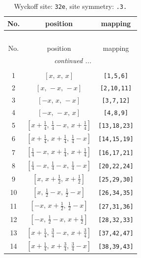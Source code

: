 \documentclass[fleqn,8pt]{jsarticle}
\begin{document}
\renewcommand{\arraystretch}{1.2}
\begin{longtable}{ccc}
\caption{Wyckoff site: {\tt 32e}, site symmetry: {\tt .3.}}
 \\
 \hline \hline
No. & position & mapping \\ \hline \endfirsthead

\multicolumn{2}{l}{\tablename\ \thetable{}} \\
 \hline \hline
No. & position & mapping \\ \hline \endhead

 \hline \hline
\multicolumn{2}{r}{\footnotesize\it continued ...} \\ \endfoot

 \hline \hline
\multicolumn{2}{r}{} \\ \endlastfoot

1 & $\left[ x,\, x,\, x \right]$ & {\tt [1,5,6]} \\ \hline
2 & $\left[ x,\, - x,\, - x \right]$ & {\tt [2,10,11]} \\ \hline
3 & $\left[ - x,\, x,\, - x \right]$ & {\tt [3,7,12]} \\ \hline
4 & $\left[ - x,\, - x,\, x \right]$ & {\tt [4,8,9]} \\ \hline
5 & $\left[ x + \frac{1}{4},\, \frac{1}{4} - x,\, x + \frac{1}{4} \right]$ & {\tt [13,18,23]} \\ \hline
6 & $\left[ x + \frac{1}{4},\, x + \frac{1}{4},\, \frac{1}{4} - x \right]$ & {\tt [14,15,19]} \\ \hline
7 & $\left[ \frac{1}{4} - x,\, x + \frac{1}{4},\, x + \frac{1}{4} \right]$ & {\tt [16,17,21]} \\ \hline
8 & $\left[ \frac{1}{4} - x,\, \frac{1}{4} - x,\, \frac{1}{4} - x \right]$ & {\tt [20,22,24]} \\ \hline
9 & $\left[ x,\, x + \frac{1}{2},\, x + \frac{1}{2} \right]$ & {\tt [25,29,30]} \\ \hline
10 & $\left[ x,\, \frac{1}{2} - x,\, \frac{1}{2} - x \right]$ & {\tt [26,34,35]} \\ \hline
11 & $\left[ - x,\, x + \frac{1}{2},\, \frac{1}{2} - x \right]$ & {\tt [27,31,36]} \\ \hline
12 & $\left[ - x,\, \frac{1}{2} - x,\, x + \frac{1}{2} \right]$ & {\tt [28,32,33]} \\ \hline
13 & $\left[ x + \frac{1}{4},\, \frac{3}{4} - x,\, x + \frac{3}{4} \right]$ & {\tt [37,42,47]} \\ \hline
14 & $\left[ x + \frac{1}{4},\, x + \frac{3}{4},\, \frac{3}{4} - x \right]$ & {\tt [38,39,43]} \\ \hline

\end{longtable}
\end{document}
